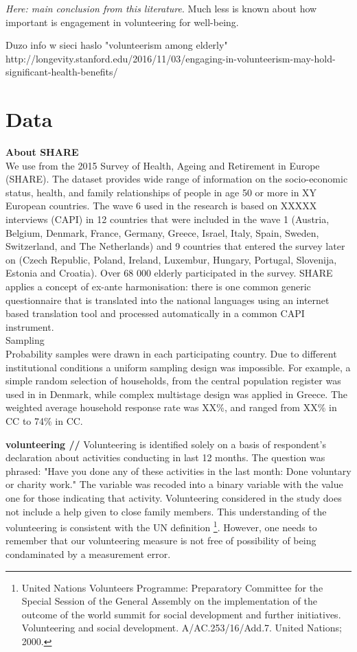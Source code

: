 \documentclass[10pt, letterpaper]{article}
\begin{document}
\begin{spacing}{1.4}
\textit{Here: main conclusion from this literature}. Much less is known about how important is engagement in volunteering  for well-being. 

Duzo info w sieci haslo "volunteerism among elderly" \\
http://longevity.stanford.edu/2016/11/03/engaging-in-volunteerism-may-hold-significant-health-benefits/

\section{Data}

\textbf{About SHARE} \\
We use from the 2015 Survey of Health, Ageing and Retirement in Europe (SHARE). The dataset provides wide range of information on the socio-economic status, health, and family relationships of people in age 50 or more in XY European countries. The wave 6 used in the research is based on XXXXX interviews (CAPI) in 12 countries that were included in the wave 1 (Austria, Belgium, Denmark, France, Germany, Greece, Israel, Italy, Spain, Sweden, Switzerland, and The Netherlands) and 9 countries that entered the survey later on (Czech Republic, Poland, Ireland, Luxembur, Hungary, Portugal, Slovenija, Estonia and Croatia). Over 68 000 elderly  participated in the survey. SHARE applies a concept of ex-ante harmonisation: there is one common generic questionnaire that is translated into the national languages using an internet based translation tool and processed automatically in a common CAPI instrument. \\

Sampling \\
Probability samples were drawn in each participating country. Due to different institutional conditions a uniform sampling design was impossible. For example, a simple random selection of
households, from the central population register was used in in Denmark, while complex multistage design was applied in Greece. The weighted average household response rate was
XX\%, and ranged from XX\% in CC to 74\% in CC. 


\textbf{volunteering //}
Volunteering is identified solely on a basis of respondent's declaration about activities conducting in last 12 months. The question was phrased: "Have you done any of these activities in the last month: Done voluntary or charity work." The variable was recoded into a binary variable with the value one for those indicating that activity. Volunteering considered in the study does not include a help given to close family members. This understanding of the volunteering is consistent with the UN definition \footnote{United Nations Volunteers Programme: Preparatory Committee for the Special Session of the General Assembly on the implementation of the outcome of the world summit for social development and further initiatives. Volunteering and social development. A/AC.253/16/Add.7. United Nations; 2000.}. However, one needs to remember that our volunteering measure is not free of possibility of being condaminated by a measurement error. 


\end{spacing}
\end{document}
